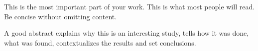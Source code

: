 \noindent
This is the most important part of your work.
This is what most people will read.
Be concise without omitting content.

A good abstract explains why this is an interesting study, tells how it was done, what was found, contextualizes the results and set conclusions.


\newpage


\tableofcontents

\listoffigures

\listoftables

\printnomenclature
